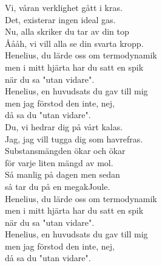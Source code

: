 \documentclass[a6paper, 10pt, twoside]{article}
\begin{document}
\noindent
\begin{center}
\end{center}
\begin{lyrics}
Vi, våran verklighet gått i kras. \\
Det, existerar ingen ideal gas. \\
Nu, alla skriker du tar av din top \\
Åååh, vi vill alla se din svarta kropp.
\vspace{5pt} \\
Henelius, du lärde oss om termodynamik \\
men i mitt hjärta har du satt en spik \\
när du sa "utan vidare".
\vspace{5pt} \\
Henelius, en huvudsats du gav till mig \\
men jag förstod den inte, nej, \\
då sa du "utan vidare".
\vspace{5pt} \\
Du, vi hedrar dig på vårt kalas. \\
Jag, jag vill tugga dig som havrefras. \\
Substansmängden ökar och ökar \\
för varje liten mängd av mol. \\
Så manlig på dagen men sedan \\
så tar du på en megakJoule.
\vspace{5pt} \\
Henelius, du lärde oss om termodynamik \\
men i mitt hjärta har du satt en spik \\
när du sa "utan vidare".
\vspace{5pt} \\
Henelius, en huvudsats du gav till mig \\
men jag förstod den inte, nej, \\
då sa du "utan vidare".
\end{lyrics}
\end{document}
